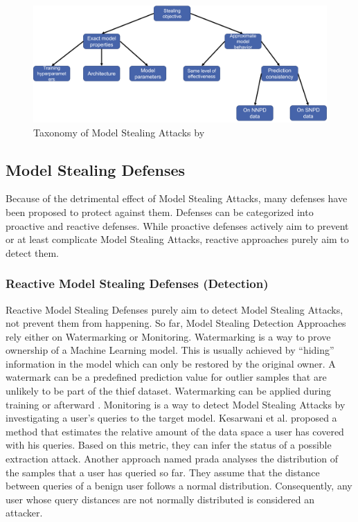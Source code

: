 \begin{figure} [ht]
  \centering
  \includegraphics[width=.9\linewidth]{images/MS_Taxonomy.png}
  \caption[Model Stealing Taxonomy]{Taxonomy of Model Stealing Attacks by \cite{oliynyk2022know}}
  \label{fig:ModelStealing:Taxonomy}
\end{figure}


\subsection{Model Stealing Defenses}
\label{sec:ModelStealing:Defenses}
Because of the detrimental effect of Model Stealing Attacks, many defenses have been proposed to protect against them. Defenses can be categorized into proactive and
reactive defenses. While proactive defenses actively aim to prevent or at least complicate Model Stealing Attacks, reactive approaches purely aim to detect them.

\subsubsection{Reactive Model Stealing Defenses (Detection)}
\label{sec:ModelStealing:Defenses:Detection}
Reactive Model Stealing Defenses purely aim to detect Model Stealing Attacks, not prevent them from happening. So far, Model Stealing Detection Approaches
rely either on Watermarking or Monitoring. Watermarking is a way to prove ownership of a Machine Learning model. This is usually achieved by \enquote{hiding} information
in the model which can only be restored by the original owner. A watermark can be a predefined prediction value for outlier samples that are unlikely to be part of the
thief dataset. Watermarking can be applied during training \cite{zhang2018protecting} or afterward \cite{szyller2021dawn}. Monitoring is a way to detect Model Stealing
Attacks by investigating a user's queries to the target model. Kesarwani et al. \cite{kesarwani2018model} proposed a method that estimates the relative amount of the
data space a user has covered with his queries. Based on this metric, they can infer the status of a possible extraction attack. Another approach named \gls{prada} 
\cite{juuti2019prada} analyses the distribution of the samples that a user has queried so far. They assume that the distance between queries of a benign user follows
a normal distribution. Consequently, any user whose query distances are not normally distributed is considered an attacker. \par

